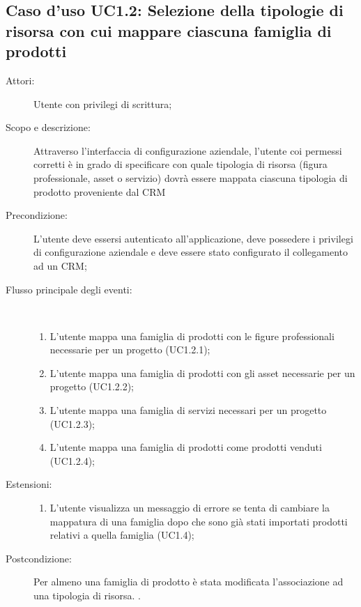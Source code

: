 \documentclass[12pt,a4paper,twoside,openright,english]{book}
\begin{document}
\subsection{Caso d'uso UC1.2: Selezione della tipologie di risorsa con cui mappare ciascuna famiglia di prodotti}\begin{description}
	\item[Attori:] Utente con privilegi di scrittura;
	\item[Scopo e descrizione:] Attraverso l’interfaccia di configurazione aziendale, l’utente coi permessi corretti è in grado di specificare con quale tipologia di risorsa (figura professionale, asset o servizio) dovrà essere mappata ciascuna tipologia di prodotto proveniente dal CRM
	\item[Precondizione:] L’utente deve essersi autenticato all’applicazione, deve possedere i privilegi di configurazione aziendale e deve essere stato configurato il collegamento ad un CRM;
	
	\item[Flusso principale degli eventi:] \ 
	\begin{enumerate}
		\item L’utente mappa una famiglia di prodotti con le figure professionali necessarie per un progetto  (UC1.2.1);
		\item L’utente mappa una famiglia di prodotti con gli asset necessarie per un progetto  (UC1.2.2);
		\item L’utente mappa una famiglia di servizi necessari per un progetto  (UC1.2.3);
		\item L’utente mappa una famiglia di prodotti come prodotti venduti (UC1.2.4);
		
	\end{enumerate}
	\item[Estensioni:]
	\begin{enumerate}
		\item L’utente visualizza un messaggio di errore se tenta di cambiare la mappatura di una famiglia dopo che sono già stati importati prodotti relativi a quella famiglia  (UC1.4);
		
	\end{enumerate}
	\item[Postcondizione:] Per almeno una famiglia di prodotto è stata modificata l’associazione ad una tipologia di risorsa. .
\end{description}


\hypertarget{UC1.3}{}
\end{document}
